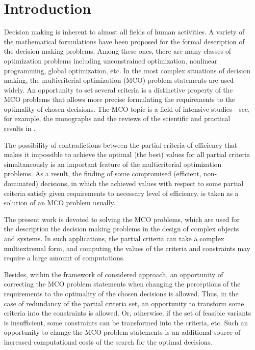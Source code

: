\documentclass{svproc}
\begin{document}
\section{ Introduction}
\label{sec:01}
Decision making is inherent to almost all fields of human activities. A variety of the mathematical formulations have been proposed for the formal description of the decision making problems. Among these ones, there are many classes of optimization problems including unconstrained optimization, nonlinear programming, global optimization, etc. In the most complex situations of decision making, the multicriterial optimization (MCO) problem statements are used widely. An opportunity to set several criteria is a distinctive property of the MCO problems that allows more precise formulating the requirements to the optimality of chosen decisions. The MCO topic is a field of intensive studies - see, for example, the monographs \cite{x1,x2,x3,x4,x5,x6} and the reviews of the scientific and practical results in \cite{x7,x8,x9,x10}.

The possibility of contradictions between the partial criteria of efficiency that makes it impossible to achieve the optimal (the best) values for all partial criteria simultaneously is an important feature of the multicriterial optimization problems. As a result, the finding of some compromised (efficient, non-dominated) decisions, in which the achieved values with respect to some partial criteria satisfy given requirements to necessary level of efficiency, is taken as a solution of an MCO problem usually. 

The present work is devoted to solving the MCO problems, which are used for the description the decision making problems in the design of complex objects and systems. In such applications, the partial criteria can take a complex multiextremal form, and computing the values of the criteria and constraints may require a large amount of computations. 

Besides, within the framework of considered approach, an opportunity of correcting the MCO problem statements when changing the perceptions of the requirements to the optimality of the chosen decisions is allowed. Thus, in the case of redundancy of the partial criteria set, an opportunity to transform some criteria into the constraints is allowed. Or, otherwise, if the set of feasible variants is insufficient, some constraints can be transformed into the criteria, etc. Such an opportunity to change the MCO problem statements is an additional source of increased computational costs of the search for the optimal decisions. 
\end{document}
